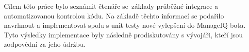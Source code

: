 \indent Cílem této práce bylo seznámit čtenáře se~základy průběžné integrace a automatizovanou kontrolou kódu. Na základě těchto informací se podařilo navrhnout a implementovat spolu s unit testy nové vylepšení do ManageIQ bota. Tyto výsledky implementace byly následně prodiskutovány s vývojáři, kteří jsou zodpovědní za jeho údržbu.
